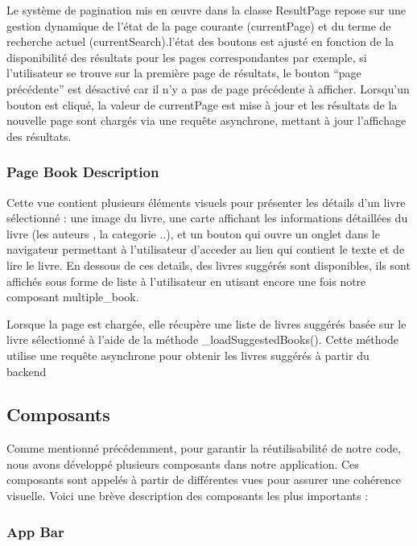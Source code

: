 Le système de pagination mis en œuvre dans la classe ResultPage repose
sur une gestion dynamique de l'état de la page courante (currentPage) et
du terme de recherche actuel (currentSearch).l'état des boutons est
ajusté en fonction de la disponibilité des résultats pour les pages
correspondantes par exemple, si l'utilisateur se trouve sur la première
page de résultats, le bouton ``page précédente'' est désactivé car il
n'y a pas de page précédente à afficher. Lorsqu'un bouton est cliqué, la
valeur de currentPage est mise à jour et les résultats de la nouvelle
page sont chargés via une requête asynchrone, mettant à jour l'affichage
des résultats.

\subsubsection{Page Book Description}\label{page-book-description}

Cette vue contient plusieurs éléments visuels pour présenter les détails
d'un livre sélectionné : une image du livre, une carte affichant les
informations détaillées du livre (les auteurs , la categorie ..), et un
bouton qui ouvre un onglet dans le navigateur permettant à l'utilisateur
d'acceder au lien qui contient le texte et de lire le livre. En dessous
de ces details, des livres suggérés sont disponibles, ils sont affichés
sous forme de liste à l'utilisateur en utisant encore une fois notre
composant multiple\_book.

Lorsque la page est chargée, elle récupère une liste de livres suggérés
basée sur le livre sélectionné à l'aide de la méthode
\_loadSuggestedBooks(). Cette méthode utilise une requête asynchrone
pour obtenir les livres suggérés à partir du backend

\subsection{Composants}\label{composants}

Comme mentionné précédemment, pour garantir la réutilisabilité de notre
code, nous avons développé plusieurs composants dans notre application.
Ces composants sont appelés à partir de différentes vues pour assurer
une cohérence visuelle. Voici une brève description des composants les
plus importants :

\subsubsection{App Bar}\label{app-bar}

